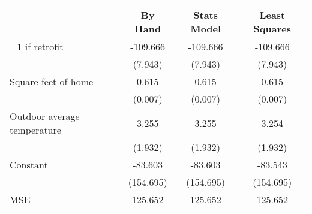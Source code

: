 \begin{tabular}{lccc}
\toprule
{} &    By Hand & Stats Model & Least Squares \\
\midrule
=1 if retrofit              &   -109.666 &    -109.666 &      -109.666 \\
                            &    (7.943) &     (7.943) &       (7.943) \\
Square feet of home         &      0.615 &       0.615 &         0.615 \\
                            &    (0.007) &     (0.007) &       (0.007) \\
Outdoor average temperature &      3.255 &       3.255 &         3.254 \\
                            &    (1.932) &     (1.932) &       (1.932) \\
Constant                    &    -83.603 &     -83.603 &       -83.543 \\
                            &  (154.695) &   (154.695) &     (154.695) \\
MSE                         &    125.652 &     125.652 &       125.652 \\
\bottomrule
\end{tabular}
